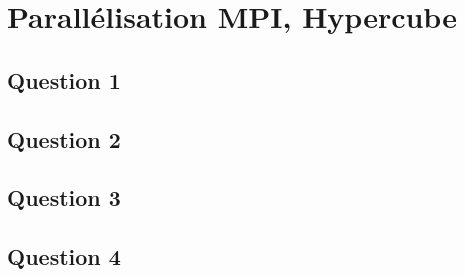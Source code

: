 \documentclass{article}
\begin{document}
\section{Parallélisation MPI, Hypercube}
\subsection*{Question 1}
\begin{resolution}
    
\end{resolution}

\newpage\subsection*{Question 2}
\begin{resolution}
    
\end{resolution}

\newpage\subsection*{Question 3}
\begin{resolution}
    
\end{resolution}

\newpage\subsection*{Question 4}
\begin{resolution}
    
\end{resolution}
\end{document}
